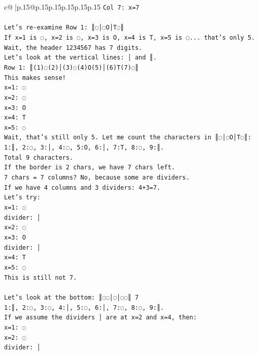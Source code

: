 \documentclass{article}
\begin{document}
{\begin{supertabular}{c@{$\;$}|p{.15\linewidth}@{}p{.15\linewidth}p{.15\linewidth}p{.15\linewidth}p{.15\linewidth}p{.15\linewidth}}
{{{\texttt{Col 7: x=7} \\
\\ 
\texttt{Let's re{-}examine Row 1: ║◌│◌O│T◌║} \\
\texttt{If x=1 is ◌, x=2 is ◌, x=3 is O, x=4 is T, x=5 is ◌... that's only 5.} \\
\texttt{Wait, the header 1234567 has 7 digits.} \\
\texttt{Let's look at the vertical lines: │ and ║.} \\
\texttt{Row 1: ║(1)◌(2)│(3)◌(4)O(5)│(6)T(7)◌║} \\
\texttt{This makes sense!} \\
\texttt{x=1: ◌} \\
\texttt{x=2: ◌} \\
\texttt{x=3: O} \\
\texttt{x=4: T} \\
\texttt{x=5: ◌} \\
\texttt{Wait, that's still only 5. Let me count the characters in ║◌│◌O│T◌║:} \\
\texttt{1:║, 2:◌, 3:│, 4:◌, 5:O, 6:│, 7:T, 8:◌, 9:║.} \\
\texttt{Total 9 characters.} \\
\texttt{If the border is 2 chars, we have 7 chars left.} \\
\texttt{7 chars = 7 columns? No, because some are dividers.} \\
\texttt{If we have 4 columns and 3 dividers: 4+3=7.} \\
\texttt{Let's try:} \\
\texttt{x=1: ◌} \\
\texttt{divider: │} \\
\texttt{x=2: ◌} \\
\texttt{x=3: O} \\
\texttt{divider: │} \\
\texttt{x=4: T} \\
\texttt{x=5: ◌} \\
\texttt{This is still not 7.} \\
\\ 
\texttt{Let's look at the bottom: ║◌◌│◌│◌◌║ 7} \\
\texttt{1:║, 2:◌, 3:◌, 4:│, 5:◌, 6:│, 7:◌, 8:◌, 9:║.} \\
\texttt{If we assume the dividers │ are at x=2 and x=4, then:} \\
\texttt{x=1: ◌} \\
\texttt{x=2: ◌} \\
\texttt{divider: │} \\
}}}
\end{supertabular}}
\end{document}
